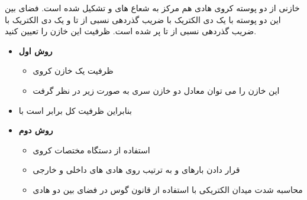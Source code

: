 \begin{ELexample}{}

خازنی از دو پوسته کروی هادی هم مرکز به شعاع های  و  تشکیل شده است. فضای بین این دو پوسته با یک دی الکتریک با ضریب گذردهی نسبی  از  تا  و یک دی الکتریک با ضریب گذردهی نسبی  از  تا  پر شده است. ظرفیت این خازن را تعیین کنید.


\begin{ELsolution}

\begin{itemize}
\tightlist
\item
  \textbf{روش اول}

  \begin{itemize}
  \tightlist
  \item
    ظرفیت یک خازن کروی \ELim{\ELto} 
  \item
    این خازن را می توان معادل دو خازن سری به صورت زیر در نظر گرفت
  \end{itemize}
\end{itemize}


\begin{itemize}
\tightlist
\item
  بنابراین ظرفیت کل برابر است با
\end{itemize}


\begin{itemize}
\tightlist
\item
  \textbf{روش دوم}

  \begin{itemize}
  \tightlist
  \item
    استفاده از دستگاه مختصات کروی
  \item
    قرار دادن بارهای  و  به ترتیب روی هادی های داخلی و خارجی
  \item
    محاسبه شدت میدان الکتریکی با استفاده از قانون گوس در فضای بین دو هادی
  \end{itemize}
\end{itemize}


\end{ELsolution}
\end{ELexample}
